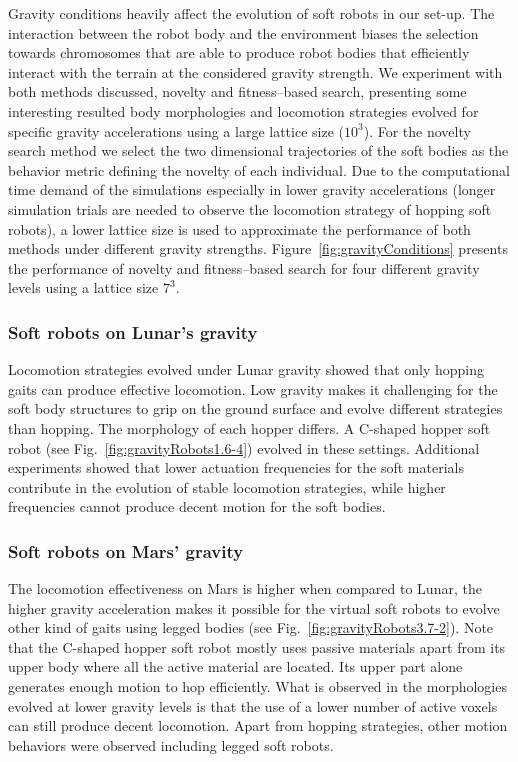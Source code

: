 \documentclass{sig-alternate}
\begin{document}
Gravity conditions heavily affect the evolution of soft robots in our set-up. The interaction between the robot body and the environment biases the selection towards chromosomes that are able to produce robot bodies that efficiently interact with the terrain at the considered gravity strength. We experiment with both methods discussed, novelty and fitness--based search, presenting some interesting resulted body morphologies and locomotion strategies evolved for specific gravity accelerations using a large lattice size ($10^3$). For the novelty search method we select the two dimensional trajectories of the soft bodies as the behavior metric defining the novelty of each individual. Due to the computational time demand of the simulations especially in lower gravity accelerations (longer simulation trials are needed to observe the locomotion strategy of hopping soft robots), a lower lattice size is used to approximate the performance of both methods under different gravity strengths. Figure~\ref{fig:gravityConditions} presents the performance of novelty and fitness--based search for four different gravity levels using a lattice size $7^3$.

\subsubsection*{Soft robots on Lunar's gravity}

Locomotion strategies evolved under Lunar gravity showed that only hopping gaits can produce effective locomotion. Low gravity makes it challenging for the soft body structures to grip on the ground surface and evolve different strategies than hopping. The morphology of each hopper differs. A C-shaped hopper soft robot (see Fig.~\ref{fig:gravityRobots1.6-4}) evolved in these settings. Additional experiments showed that lower actuation frequencies for the soft materials contribute in the evolution of stable locomotion strategies, while higher frequencies cannot produce decent motion for the soft bodies.

\subsubsection*{Soft robots on Mars' gravity}

The locomotion effectiveness on Mars is higher when compared to Lunar, the higher gravity acceleration makes it possible for the virtual soft robots to evolve other kind of gaits using legged bodies (see Fig.~\ref{fig:gravityRobots3.7-2}). Note that the C-shaped hopper soft robot mostly uses passive materials apart from its upper body where all the active material are located. Its upper part alone generates enough motion to hop efficiently. What is observed in the morphologies evolved at lower gravity levels is that the use of a lower number of active voxels can still produce decent locomotion. Apart from hopping strategies, other motion behaviors were observed including legged soft robots.
\end{document}
